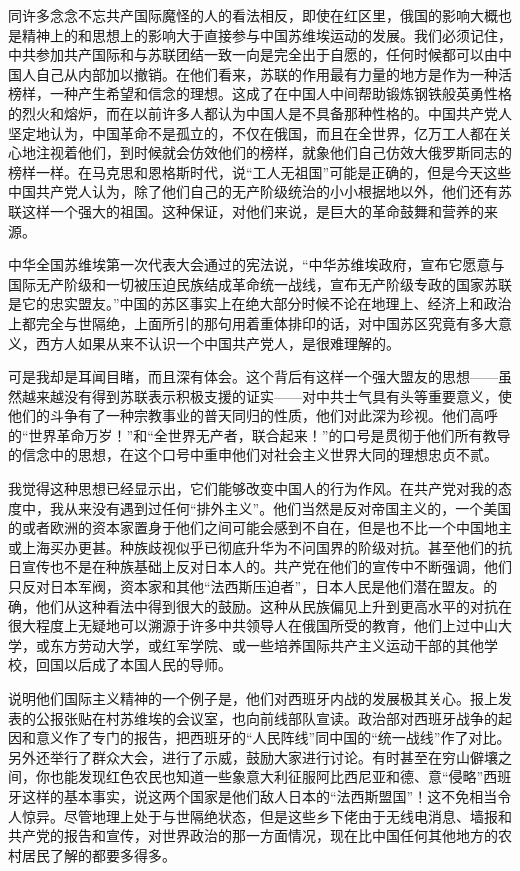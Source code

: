 \documentclass[10pt]{book}
\begin{document}
同许多念念不忘共产国际魔怪的人的看法相反，即使在红区里，俄国的影响大概也是精神上的和思想上的影响大于直接参与中国苏维埃运动的发展。我们必须记住，中共参加共产国际和与苏联团结一致一向是完全出于自愿的，任何时候都可以由中国人自己从内部加以撤销。在他们看来，苏联的作用最有力量的地方是作为一种活榜样，一种产生希望和信念的理想。这成了在中国人中间帮助锻炼钢铁般英勇性格的烈火和熔炉，而在以前许多人都认为中国人是不具备那种性格的。中国共产党人坚定地认为，中国革命不是孤立的，不仅在俄国，而且在全世界，亿万工人都在关心地注视着他们，到时候就会仿效他们的榜样，就象他们自己仿效大俄罗斯同志的榜样一样。在马克思和恩格斯时代，说“工人无祖国”可能是正确的，但是今天这些中国共产党人认为，除了他们自己的无产阶级统治的小小根据地以外，他们还有苏联这样一个强大的祖国。这种保证，对他们来说，是巨大的革命鼓舞和营养的来源。

中华全国苏维埃第一次代表大会通过的宪法说，“中华苏维埃政府，宣布它愿意与国际无产阶级和一切被压迫民族结成革命统一战线，宣布无产阶级专政的国家苏联是它的忠实盟友。”中国的苏区事实上在绝大部分时候不论在地理上、经济上和政治上都完全与世隔绝，上面所引的那句用着重体排印的话，对中国苏区究竟有多大意义，西方人如果从来不认识一个中国共产党人，是很难理解的。

可是我却是耳闻目睹，而且深有体会。这个背后有这样一个强大盟友的思想——虽然越来越没有得到苏联表示积极支援的证实——对中共士气具有头等重要意义，使他们的斗争有了一种宗教事业的普天同归的性质，他们对此深为珍视。他们高呼的“世界革命万岁！”和“全世界无产者，联合起来！”的口号是贯彻于他们所有教导的信念中的思想，在这个口号中重申他们对社会主义世界大同的理想忠贞不贰。

我觉得这种思想已经显示出，它们能够改变中国人的行为作风。在共产党对我的态度中，我从来没有遇到过任何“排外主义”。他们当然是反对帝国主义的，一个美国的或者欧洲的资本家置身于他们之间可能会感到不自在，但是也不比一个中国地主或上海买办更甚。种族歧视似乎已彻底升华为不问国界的阶级对抗。甚至他们的抗日宣传也不是在种族基础上反对日本人的。共产党在他们的宣传中不断强调，他们只反对日本军阀，资本家和其他“法西斯压迫者”，日本人民是他们潜在盟友。的确，他们从这种看法中得到很大的鼓励。这种从民族偏见上升到更高水平的对抗在很大程度上无疑地可以溯源于许多中共领导人在俄国所受的教育，他们上过中山大学，或东方劳动大学，或红军学院、或一些培养国际共产主义运动干部的其他学校，回国以后成了本国人民的导师。

说明他们国际主义精神的一个例子是，他们对西班牙内战的发展极其关心。报上发表的公报张贴在村苏维埃的会议室，也向前线部队宣读。政治部对西班牙战争的起因和意义作了专门的报告，把西班牙的“人民阵线”同中国的“统一战线”作了对比。另外还举行了群众大会，进行了示威，鼓励大家进行讨论。有时甚至在穷山僻壤之间，你也能发现红色农民也知道一些象意大利征服阿比西尼亚和德、意“侵略”西班牙这样的基本事实，说这两个国家是他们敌人日本的“法西斯盟国”！这不免相当令人惊异。尽管地理上处于与世隔绝状态，但是这些乡下佬由于无线电消息、墙报和共产党的报告和宣传，对世界政治的那一方面情况，现在比中国任何其他地方的农村居民了解的都要多得多。
\end{document}
